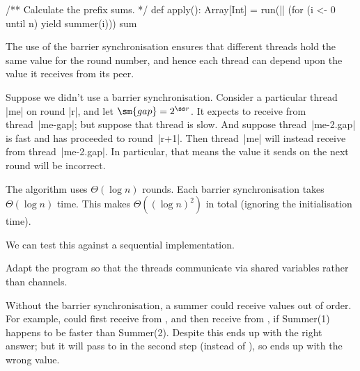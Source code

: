 
\begin{slide}

\begin{scala}
  /** Calculate the prefix sums. */
  def apply(): Array[Int] = {
    run(|| (for (i <- 0 until n) yield summer(i)))
    sum
  }
\end{scala}
\end{slide}


\begin{slide}

The use of the barrier synchronisation ensures that different
threads hold the same value for the round number, and hence each thread can
depend upon the value it receives from its peer.

Suppose we didn't use a barrier synchronisation.  Consider a particular thread
|me| on round |r|, and let $\sm{gap} = 2^{\ss r}$.  It expects to receive from
thread~|me-gap|; but suppose that thread is slow.  And suppose
thread~|me-2.gap| is fast and has proceeded to round~|r+1|.  Then thread~|me|
will instead receive from thread~|me-2.gap|.  In particular, that means the
value it sends on the next round will be incorrect.
\end{slide}


\begin{slide}

The algorithm uses $\Theta(\log n)$ rounds.  Each barrier synchronisation
takes $\Theta(\log n)$ time.  This makes $\Theta((\log n)^2)$ in total
(ignoring the initialisation time).

\bigskip


We can test this against a sequential implementation. 


\bigskip


Adapt the program so that the threads communicate via shared variables rather
than channels.
\end{slide}


\begin{selfnote}
Without the barrier synchronisation, a summer could receive values out of
order.  For example,  could first receive 
from , and then receive  from ,
if Summer(1) happens to be faster than Summer(2).  Despite this
 ends up with the right answer; but it will pass
 to  in the second step (instead of
), so  ends up with the wrong value.
\end{selfnote}
